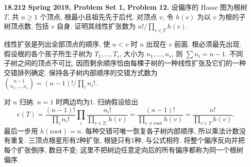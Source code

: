 \begin{exercise}\label{mit:18212-pset1-q12}
\textbf{18.212 Spring 2019, Problem Set 1, Problem 12.}
设偏序的 Hasse 图为根树 $T$, 共 $n\ge1$ 个顶点, 根最小且祖先先于后代. 对顶点 $v$, 令 $h(v)$ 为以 $v$ 为根的子树顶点数, 包括 $v$ 自身. 证明其线性扩张数为
$n!/\prod_{v\in T}h(v)$.
\end{exercise}
\begin{solution}
线性扩张是列出全部顶点的顺序, 使 $u<v$ 时 $u$ 出现在 $v$ 前面. 根必须最先出现. 假设根的各个孩子所生子树为 $T_1,\ldots,T_s$, 大小为 $n_1,\ldots,n_s$, 则 $\sum n_i=n-1$. 不同子树之间的顶点不可比, 因而剩余顺序恰由每棵子树的一种线性扩张及它们的一种交错排列确定. 保持各子树内部顺序的交错方式数为
$\binom{n-1}{n_1,\ldots,n_s}=(n-1)!/\prod_i n_i!$.

对 $n$ 归纳. $n=1$ 时两边均为1. 归纳假设给出
\[
 e(T)=\frac{(n-1)!}{\prod_i n_i!}
       \prod_i\frac{n_i!}{\prod_{v\in T_i}h(v)}
      =\frac{(n-1)!}{\prod_{v\ne\mathrm{root}}h(v)}
      =\frac{n!}{\prod_{v\in T}h(v)},
\]
最后一步用 $h(\mathrm{root})=n$. 每种交错可唯一恢复各子树内部顺序, 所以乘法计数没有重复. 三顶点根星形有2种扩张, 根链只有1种, 与公式相符. 将整个偏序反向并把每个扩张倒序, 数目不变; 这里不把树边任意定向后的所有偏序都称为同一个根树偏序.
\end{solution}

